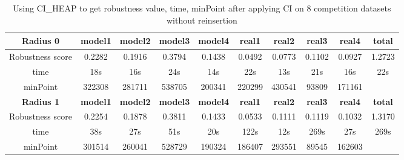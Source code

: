 \documentclass{article}
\begin{document}
	
	\begin{table}[]
		\begin{adjustwidth}{-1cm}{}		
			\begin{threeparttable}		
				\centering
				\caption{Using CI\_HEAP to get robustness value, time, minPoint after applying CI on 8 competition datasets without reinsertion}
				\label{tab:table9}
				\begin{tabular}{|c|c|c|c|c|c|c|c|c|c|}
					\hline
					\textbf{Radius 0} & \textbf{model1} & \textbf{model2} & \textbf{model3} & \textbf{model4} & \textbf{real1} & \textbf{real2} & \textbf{real3} & \textbf{real4} & \textbf{total} \\ \hline
					Robustness score                 & 0.2282          & 0.1916          & 0.3794          & 0.1438          & 0.0492         & 0.0773         & 0.1102         & 0.0927         & 1.2723         \\ \hline
					time                             & 18s             & 16s             & 24s             & 14s             & 22s            & 13s            & 21s            & 16s            & 22s            \\ \hline
					minPoint                         & 322308          & 281711          & 538705          & 200341          & 220299         & 430541         & 93809          & 171161         &                \\ \hline
					
					\textbf{Radius 1} & \textbf{model1} & \textbf{model2} & \textbf{model3} & \textbf{model4} & \textbf{real1} & \textbf{real2} & \textbf{real3} & \textbf{real4} & \textbf{total} \\ \hline
					Robustness score                 & 0.2254          & 0.1878          & 0.3811          & 0.1433          & 0.0533         & 0.1111         & 0.1119         & 0.1032         & 1.3170         \\ \hline
					time                             & 38s             & 27s             & 51s             & 20s             & 122s           & 12s            & 269s           & 27s            & 269s           \\ \hline
					minPoint                         & 301514          & 260041          & 528729          & 190324          & 186407         & 293551         & 89545          & 162603         &                \\ \hline
					

\end{tabular}
\end{threeparttable}
\end{adjustwidth}
\end{table}
\end{document}
